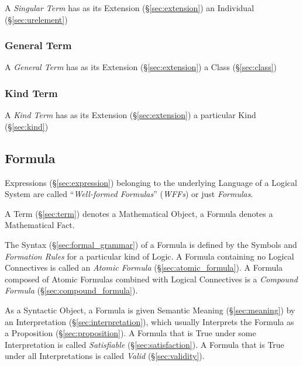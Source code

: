 A \emph{Singular Term} has as its Extension (\S\ref{sec:extension}) an
Individual (\S\ref{sec:urelement})



\subsubsection{General Term}\label{sec:general_term}
\cite{chalmers02}

A \emph{General Term} has as its Extension (\S\ref{sec:extension}) a
Class (\S\ref{sec:class})



\subsubsection{Kind Term}\label{sec:kind_term}
\cite{chalmers02}

A \emph{Kind Term} has as its Extension (\S\ref{sec:extension}) a
particular Kind (\S\ref{sec:kind})




\subsection{Formula}\label{sec:formula}

Expressions (\S\ref{sec:expression}) belonging to the underlying Language of a
Logical System are called ``\emph{Well-formed Formulas}'' (\emph{WFFs}) or just
\emph{Formulas}.

A Term (\S\ref{sec:term}) denotes a Mathematical Object, a Formula
denotes a Mathematical Fact.

The Syntax (\S\ref{sec:formal_grammar}) of a Formula is defined by the
Symbols and \emph{Formation Rules} for a particular kind of Logic. A
Formula containing no Logical Connectives is called an \emph{Atomic
  Formula} (\S\ref{sec:atomic_formula}). A Formula composed of Atomic
Formulas combined with Logical Connectives is a \emph{Compound
  Formula} (\S\ref{sec:compound_formula}).

As a Syntactic Object, a Formula is given Semantic Meaning
(\S\ref{sec:meaning}) by an Interpretation
(\S\ref{sec:interpretation}), which usually Interprets the Formula as
a Proposition (\S\ref{sec:proposition}). A Formula that is True under
some Interpretation is called \emph{Satisfiable}
(\S\ref{sec:satisfaction}). A Formula that is True under all
Interpretations is called \emph{Valid} (\S\ref{sec:validity}).

